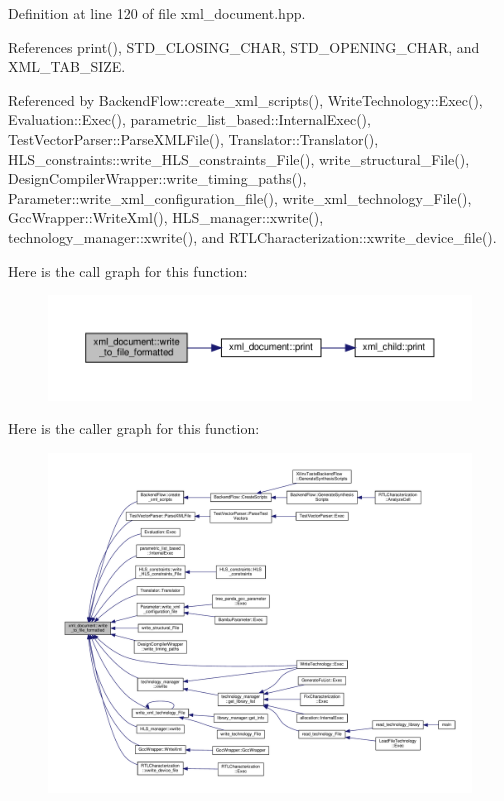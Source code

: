 Definition at line 120 of file xml\+\_\+document.\+hpp.



References print(), S\+T\+D\+\_\+\+C\+L\+O\+S\+I\+N\+G\+\_\+\+C\+H\+AR, S\+T\+D\+\_\+\+O\+P\+E\+N\+I\+N\+G\+\_\+\+C\+H\+AR, and X\+M\+L\+\_\+\+T\+A\+B\+\_\+\+S\+I\+ZE.



Referenced by Backend\+Flow\+::create\+\_\+xml\+\_\+scripts(), Write\+Technology\+::\+Exec(), Evaluation\+::\+Exec(), parametric\+\_\+list\+\_\+based\+::\+Internal\+Exec(), Test\+Vector\+Parser\+::\+Parse\+X\+M\+L\+File(), Translator\+::\+Translator(), H\+L\+S\+\_\+constraints\+::write\+\_\+\+H\+L\+S\+\_\+constraints\+\_\+\+File(), write\+\_\+structural\+\_\+\+File(), Design\+Compiler\+Wrapper\+::write\+\_\+timing\+\_\+paths(), Parameter\+::write\+\_\+xml\+\_\+configuration\+\_\+file(), write\+\_\+xml\+\_\+technology\+\_\+\+File(), Gcc\+Wrapper\+::\+Write\+Xml(), H\+L\+S\+\_\+manager\+::xwrite(), technology\+\_\+manager\+::xwrite(), and R\+T\+L\+Characterization\+::xwrite\+\_\+device\+\_\+file().

Here is the call graph for this function\+:
\nopagebreak
\begin{figure}[H]
\begin{center}
\leavevmode
\includegraphics[width=350pt]{d8/dee/classxml__document_a9dd04cd3a1d5157886388a17134bafa1_cgraph}
\end{center}
\end{figure}
Here is the caller graph for this function\+:
\nopagebreak
\begin{figure}[H]
\begin{center}
\leavevmode
\includegraphics[width=350pt]{d8/dee/classxml__document_a9dd04cd3a1d5157886388a17134bafa1_icgraph}
\end{center}
\end{figure}


